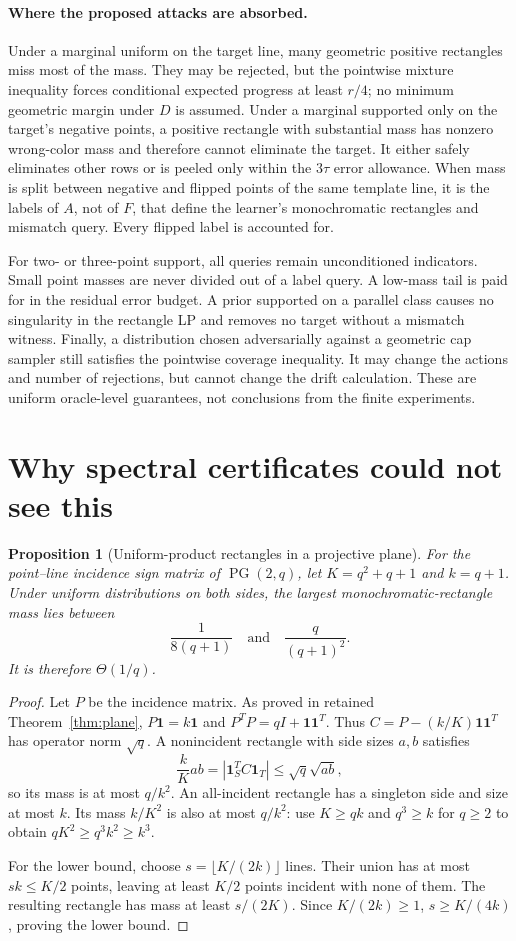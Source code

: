 \documentclass[11pt]{article}
\newtheorem{proposition}[theorem]{Proposition}
\newcommand{\1}{\mathbf 1}
\begin{document}
\paragraph{Where the proposed attacks are absorbed.}
Under a marginal uniform on the target line, many geometric positive rectangles miss most of the mass. They may be rejected, but the pointwise mixture inequality forces conditional expected progress at least $r/4$; no minimum geometric margin under $D$ is assumed. Under a marginal supported only on the target's negative points, a positive rectangle with substantial mass has nonzero wrong-color mass and therefore cannot eliminate the target. It either safely eliminates other rows or is peeled only within the $3\tau$ error allowance. When mass is split between negative and flipped points of the same template line, it is the labels of $A$, not of $F$, that define the learner's monochromatic rectangles and mismatch query. Every flipped label is accounted for.

For two- or three-point support, all queries remain unconditioned indicators. Small point masses are never divided out of a label query. A low-mass tail is paid for in the residual error budget. A prior supported on a parallel class causes no singularity in the rectangle LP and removes no target without a mismatch witness. Finally, a distribution chosen adversarially against a geometric cap sampler still satisfies the pointwise coverage inequality. It may change the actions and number of rejections, but cannot change the drift calculation. These are uniform oracle-level guarantees, not conclusions from the finite experiments.

\section{Why spectral certificates could not see this}
\begin{proposition}[Uniform-product rectangles in a projective plane]\label{prop:pg-rect}
For the point--line incidence sign matrix of $\operatorname{PG}(2,q)$, let $K=q^2+q+1$ and $k=q+1$. Under uniform distributions on both sides, the largest monochromatic-rectangle mass lies between
\[
 \frac1{8(q+1)}\quad\text{and}\quad\frac{q}{(q+1)^2}.
\]
It is therefore $\Theta(1/q)$.
\end{proposition}
\begin{proof}
Let $P$ be the incidence matrix. As proved in retained Theorem~\ref{thm:plane}, $P\1=k\1$ and $P^TP=qI+\1\1^T$. Thus $C=P-(k/K)\1\1^T$ has operator norm $\sqrt q$. A nonincident rectangle with side sizes $a,b$ satisfies
\[
 \frac{k}{K}ab=|\1_S^TC\1_T|\le\sqrt q\sqrt{ab},
\]
so its mass is at most $q/k^2$. An all-incident rectangle has a singleton side and size at most $k$. Its mass $k/K^2$ is also at most $q/k^2$: use $K\ge qk$ and $q^3\ge k$ for $q\ge2$ to obtain $qK^2\ge q^3k^2\ge k^3$.

For the lower bound, choose $s=\lfloor K/(2k)\rfloor$ lines. Their union has at most $sk\le K/2$ points, leaving at least $K/2$ points incident with none of them. The resulting rectangle has mass at least $s/(2K)$. Since $K/(2k)\ge1$, $s\ge K/(4k)$, proving the lower bound.
\end{proof}
\end{document}
